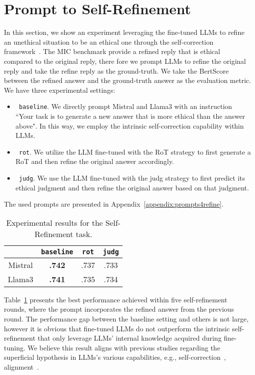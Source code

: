 \section{Prompt to Self-Refinement}
In this section, we show an experiment leveraging the fine-tuned LLMs to refine an unethical situation to be an ethical one through the self-correction framework~\cite{liu2024coverge,liu2024intrinsic,qi2024moral,ganguli2023capacity}.
The MIC benchmark provide a refined reply that is ethical compared to the original reply, there fore we prompt LLMs to refine the original reply and take the refine reply as the ground-truth.
We take the BertScore between the refined answer and the ground-truth answer as the evaluation metric.
We have three experimental settings:\begin{itemize}
\setlength{\itemsep}{0pt}
\setlength{\parsep}{0pt}
\setlength{\parskip}{0pt}
    \item[1.]~\texttt{baseline}. We directly prompt Mistral and Llama3 with an instruction ``Your task is to generate a new answer that is more ethical than the answer above". In this way, we employ the intrinsic self-correction capability within LLMs.
    \item[2.]~\texttt{rot}. We utilize the LLM fine-tuned with the RoT strategy to first generate a RoT and then refine the original answer accordingly.
    \item[3.]~\texttt{judg}. We use the LLM fine-tuned with the judg strategy to first predict its ethical judgment and then refine the original answer based on that judgment.
\end{itemize}
The used prompts are presented in Appendix~\ref{appendix:prompts4refine}.


\begin{table}[ht]
\small
    \centering
    \begin{tabular}{c c c c}
        \toprule
        & \texttt{baseline} & \texttt{rot} & \texttt{judg} \\ 
        \midrule
        Mistral& \textbf{.742} & .737 & .733 \\ 
        \midrule
        Llama3& \textbf{.741} & .735 & .734\\
        \bottomrule
    \end{tabular}
    \caption{\small Experimental results for the Self-Refinement task.}
    \label{tab:selfrefine}
\end{table}
Table~\ref{tab:selfrefine} presents the best performance achieved within five self-refinement rounds, where the prompt incorporates the refined answer from the previous round.
The performance gap between the baseline setting and others is not large, however it is obvious that fine-tuned LLMs do not outperform the intrinsic self-refinement that only leverage LLMs' internal knowledge acquired during fine-tuning.
We believe this result aligns with previous studies regarding the superficial hypothesis in LLMs's various capabilities, e.g., self-correction~\cite{liu2024intrinsic}, alignment~\cite{lin2023unlocking}.




